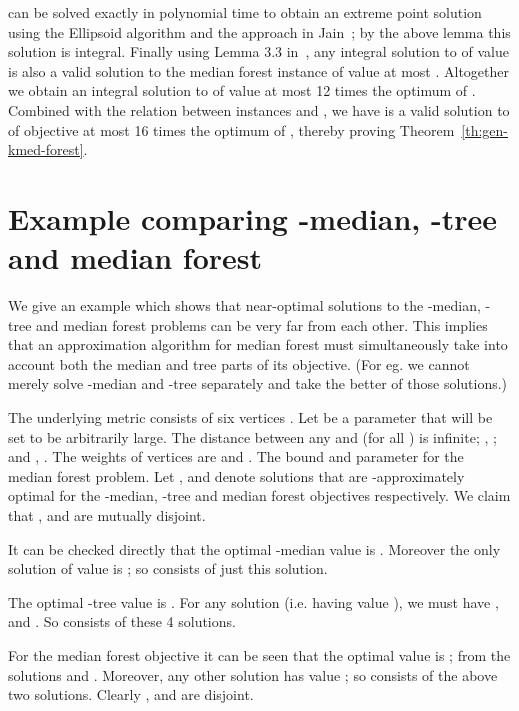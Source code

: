 \documentclass[11pt,twoside,a4paper]{article}
\def\kmf{ median forest\xspace}
\begin{document}
 can be solved exactly in polynomial time to obtain an extreme point solution using the Ellipsoid
algorithm and the approach in Jain~\cite{J01}; by the above lemma this solution is integral. Finally using Lemma 3.3
in~\cite{KKNSS11}, any integral solution to  of value  is also a valid solution to the \kmf
instance \J of value at most . Altogether we obtain an integral solution  to \J of value at most 12
times the optimum of . Combined with the relation between instances \I and \J, we have  is a valid
solution to \I of objective at most 16 times the optimum of \I, thereby proving Theorem~\ref{th:gen-kmed-forest}.







\appendix

\section{Example comparing -median, -tree and \kmf}\label{app:example}
We give an example which shows that near-optimal solutions to the -median, -tree and \kmf problems can be very
far from each other. This implies that an approximation algorithm for \kmf must simultaneously take into account both
the median and tree parts of its objective. (For eg. we cannot merely solve -median and -tree separately and take
the better of those solutions.)

The underlying metric consists of six vertices . Let  be a parameter that
will be set to be arbitrarily large. The distance between any  and  (for all ) is infinite;
, ; and , . The weights
of vertices are  and . The bound  and parameter 
for the \kmf problem. Let ,  and  denote solutions that are -approximately optimal
for the -median, -tree and \kmf objectives respectively. We claim that ,  and  are
mutually disjoint.

It can be checked directly that the optimal -median value is . Moreover the only
solution of value  is ; so  consists of just this solution.

The optimal -tree value is . For any solution  (i.e. having value
), we must have ,  and . So  consists
of these 4 solutions.

For the \kmf objective it can be seen that the optimal value is ; from
the solutions  and . Moreover, any other solution has value ;
so  consists of the above two solutions. Clearly ,  and  are disjoint.
\end{document}
